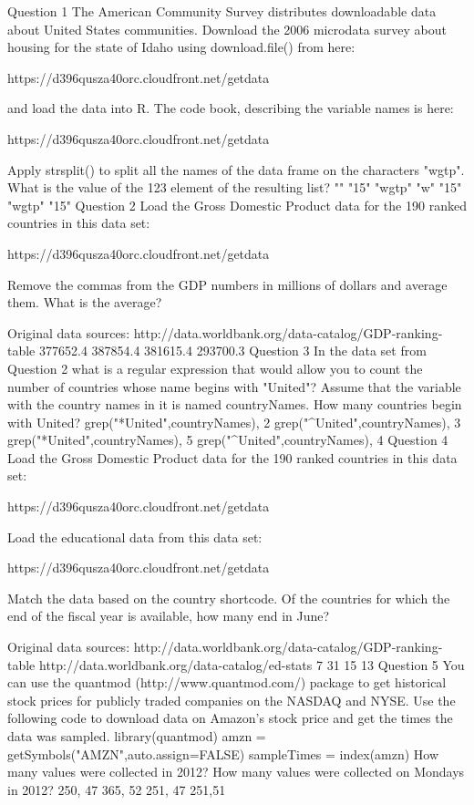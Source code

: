 Question 1
The American Community Survey distributes downloadable data about United States communities. Download the 2006 microdata survey about housing for the state of Idaho using download.file() from here: 

https://d396qusza40orc.cloudfront.net/getdata%

and load the data into R. The code book, describing the variable names is here: 

https://d396qusza40orc.cloudfront.net/getdata%

Apply strsplit() to split all the names of the data frame on the characters "wgtp". What is the value of the 123 element of the resulting list?
"" "15"
"wgtp"
"w" "15"
"wgtp" "15"
Question 2
Load the Gross Domestic Product data for the 190 ranked countries in this data set: 

https://d396qusza40orc.cloudfront.net/getdata%

Remove the commas from the GDP numbers in millions of dollars and average them. What is the average? 

Original data sources: http://data.worldbank.org/data-catalog/GDP-ranking-table
377652.4
387854.4
381615.4
293700.3
Question 3
In the data set from Question 2 what is a regular expression that would allow you to count the number of countries whose name begins with "United"? Assume that the variable with the country names in it is named countryNames. How many countries begin with United?
grep("*United",countryNames), 2
grep("^United",countryNames), 3
grep("*United",countryNames), 5
grep("^United",countryNames), 4
Question 4
Load the Gross Domestic Product data for the 190 ranked countries in this data set: 

https://d396qusza40orc.cloudfront.net/getdata%

Load the educational data from this data set: 

https://d396qusza40orc.cloudfront.net/getdata%

Match the data based on the country shortcode. Of the countries for which the end of the fiscal year is available, how many end in June? 

Original data sources: 
http://data.worldbank.org/data-catalog/GDP-ranking-table 
http://data.worldbank.org/data-catalog/ed-stats
7
31
15
13
Question 5
You can use the quantmod (http://www.quantmod.com/) package to get historical stock prices for publicly traded companies on the NASDAQ and NYSE. Use the following code to download data on Amazon's stock price and get the times the data was sampled.
library(quantmod)
amzn = getSymbols("AMZN",auto.assign=FALSE)
sampleTimes = index(amzn) 
How many values were collected in 2012? How many values were collected on Mondays in 2012?
250, 47
365, 52
251, 47
251,51
